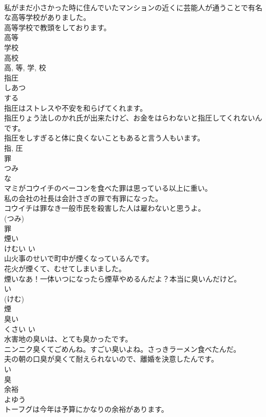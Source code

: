\documentclass[8pt]{extreport}
\begin{document}
\begin{CJK}{UTF8}{min}
\\	私がまだ小さかった時に住んでいたマンションの近くに芸能人が通うことで有名な高等学校がありました。	
\\	高等学校で教頭をしております。	
\\	高等 
\\	学校 
\\	高校 
\\	高, 等, 学, 校	
\\	指圧	
\\	しあつ	
\\	する 
\\	指圧はストレスや不安を和らげてくれます。	
\\	指圧りょう法しのかれ氏が出来たけど、お金をはらわないと指圧してくれないんです。	
\\	指圧をしすぎると体に良くないこともあると言う人もいます。	
\\	指, 圧	
\\	罪	
\\	つみ	
\\	な 
\\	マミがコウイチのベーコンを食べた罪は思っている以上に重い。	
\\	私の会社の社長は会計さぎの罪で有罪になった。	
\\	コウイチは罪なき一般市民を殺害した人は雇わないと思うよ。	
\\	(つみ) 
\\	罪	
\\	煙い	
\\	けむい	い 
\\	山火事のせいで町中が煙くなっているんです。	
\\	花火が煙くて、むせてしまいました。	
\\	煙いなあ！一体いつになったら煙草やめるんだよ？本当に臭いんだけど。	
\\	い 
\\	(けむ) 
\\	煙	
\\	臭い	
\\	くさい	い 
\\	水害地の臭いは、とても臭かったです。	
\\	ニンニク臭くてごめんね。すごい臭いよね。さっきラーメン食べたんだ。	
\\	夫の朝の口臭が臭くて耐えられないので、離婚を決意したんです。	
\\	い 
\\	臭	
\\	余裕	
\\	よゆう	
\\	トーフグは今年は予算にかなりの余裕があります。	

\end{CJK}
\end{document}
